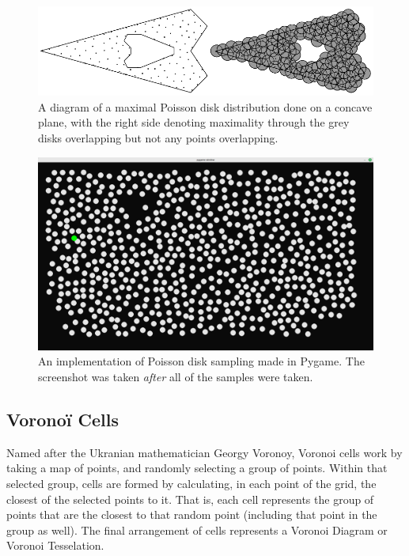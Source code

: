 \begin{figure}[H]
    \centering
    \includegraphics[width=\textwidth]{Images/maximalpoissonsample.png}
    \caption{A diagram of a maximal Poisson disk distribution done on a concave plane, with the right side denoting maximality through the grey disks overlapping but not any points overlapping.\cite{10.1145/1964921.1964944}}
    \label{fig:maximalpoisson}
\end{figure}

\begin{figure}[H]
    \centering
    \includegraphics[width=\textwidth]{Images/pygamepoissonsample.png}
    \caption{An implementation of Poisson disk sampling made in Pygame.\cite{pygamepoissondisksampling} The screenshot was taken \textit{after} all of the samples were taken.}
    \label{fig:pygamepoisson}
\end{figure}

\subsection{Voronoï Cells}

Named after the Ukranian mathematician Georgy Voronoy, Voronoi cells work by taking a map of points, and randomly selecting a group of points. Within that selected group, cells are formed by calculating, in each point of the grid, the closest of the selected points to it. That is, each cell represents the group of points that are the closest to that random point (including that point in the group as well). The final arrangement of cells represents a Voronoi Diagram or Voronoi Tesselation.

